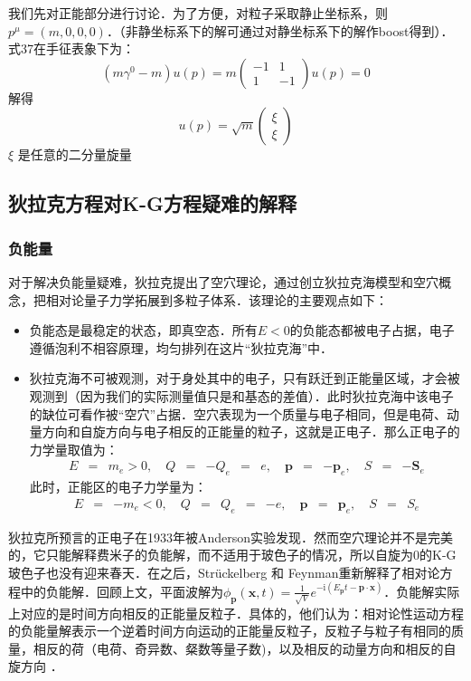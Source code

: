 我们先对正能部分进行讨论．为了方便，对粒子采取静止坐标系，则 $p^\mu=(m,0,0,0)$．（非静坐标系下的解可通过对静坐标系下的解作boost得到）．式37在手征表象下为：
\begin{equation}
\left(m \gamma^{0}-m\right) u\left(p\right)=m\left(\begin{array}{rr}
-1 & 1 \\
1 & -1
\end{array}\right) u\left(p\right)=0
\end{equation}
解得\begin{equation}
u\left(p\right)=\sqrt{m}\left(\begin{array}{l}
\xi \\
\xi
\end{array}\right)
\end{equation}
$\xi$ 是任意的二分量旋量 
\subsection{狄拉克方程对K-G方程疑难的解释}
\subsubsection{负能量}
对于解决负能量疑难，狄拉克提出了空穴理论，通过创立狄拉克海模型和空穴概念，把相对论量子力学拓展到多粒子体系．该理论的主要观点如下：
\begin{itemize}
\item  负能态是最稳定的状态，即真空态．所有$E<0$的负能态都被电子占据，电子遵循泡利不相容原理，均匀排列在这片“狄拉克海”中．
\item 狄拉克海不可被观测，对于身处其中的电子，只有跃迁到正能量区域，才会被观测到（因为我们的实际测量值只是和基态的差值）．此时狄拉克海中该电子的缺位可看作被“空穴”占据．空穴表现为一个质量与电子相同，但是电荷、动量方向和自旋方向与电子相反的正能量的粒子，这就是正电子．那么正电子的力学量取值为：\begin{eqnarray}
E & = & m_{e}>0, \quad Q & = & -Q_{e} & = & e, \quad \boldsymbol{p} & = & -\boldsymbol{p}_{e}, \quad S & = & -\boldsymbol{S}_{e}
\end{eqnarray}
此时，正能区的电子力学量为：
\begin{eqnarray}
E & = & -m_{e}<0, \quad Q & = & Q_{e} & = & -e, \quad \boldsymbol{p} & = & \boldsymbol{p}_{e}, \quad S & = & S_{e}
\end{eqnarray}

\end{itemize}
狄拉克所预言的正电子在1933年被Anderson实验发现．然而空穴理论并不是完美的，它只能解释费米子的负能解，而不适用于玻色子的情况，所以自旋为0的K-G玻色子也没有迎来春天．在之后，Strückelberg 和 Feynman重新解释了相对论方程中的负能解．回顾上文，平面波解为$\phi_{\boldsymbol{p}}(\boldsymbol{x}, t)=\frac{1}{\sqrt{V}} e^{-\mathrm{i}\left(E_{\boldsymbol{p}} t-\boldsymbol{p} \cdot \boldsymbol{x}\right)}$．负能解实际上对应的是时间方向相反的正能量反粒子．具体的，他们认为：相对论性运动方程的负能量解表示一个逆着时间方向运动的正能量反粒子，反粒子与粒子有相同的质量，相反的荷（电荷、奇异数、粲数等量子数)，以及相反的动量方向和相反的自旋方向
．
